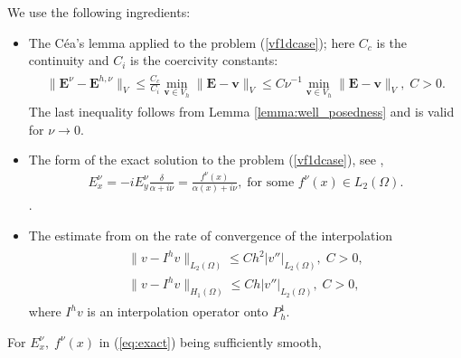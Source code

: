 We use the following ingredients:
\begin{itemize}
 \item The C\'ea's lemma applied to the problem (\ref{vf1dcase}); here $C_c$ is the continuity and $C_i$ is the coercivity constants:
\begin{align}
\label{eq:cea}
\begin{split}
 \|\mathbf{E}^{\nu}-\mathbf{E}^{h,\nu}\|_{V}\leq \frac{C_c}{C_i}\min_{\mathbf{v}\in V_h}\|\mathbf{E}-\mathbf{v}\|_{V}
 \leq C\nu^{-1}\min_{\mathbf{v}\in V_h}\|\mathbf{E}-\mathbf{v}\|_{V},\; C>0.
 \end{split}
\end{align}
The last inequality follows from Lemma \ref{lemma:well_posedness} and is valid for $\nu\rightarrow 0$.   
\item The form of the exact solution to the problem (\ref{vf1dcase}), see \cite{Despres_2014},
\begin{align}
\label{eq:exact}
 E_x^{\nu}=-iE_{y}^{\nu}\frac{\delta}{\alpha+i\nu}=\frac{f^{\nu}(x)}{\alpha(x)+i\nu}, \; \text{for some }f^{\nu}(x)\in L_{2}(\Omega).
\end{align}
.
\item The estimate from \cite[Chapter 0]{brenner} on the rate of convergence of the interpolation 
\begin{align}
\label{eq:interp}
\begin{split}
 \|v-I^{h}v\|_{L_{2}(\Omega)}\leq Ch^2\left|v''\right|_{L_{2}(\Omega)},\; C>0,\\
 \|v-I^{h}v\|_{H_{1}(\Omega)}\leq Ch|v''|_{L_{2}(\Omega)},\; C>0, 
 \end{split}
\end{align}
where $I^{h}v$ is an interpolation operator onto $P_{h}^{1}$. 
\end{itemize}
 For $E_x^{\nu},\; f^{\nu}(x)$ in (\ref{eq:exact}) being sufficiently smooth, 
